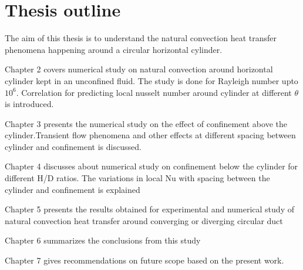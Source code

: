 \section{Thesis outline}
The aim of this thesis is to understand the natural convection heat transfer phenomena happening around a circular horizontal cylinder. 

 Chapter 2 covers numerical study on natural convection around horizontal cylinder kept in an unconfined fluid. The study is done for Rayleigh number upto $10^6$. Correlation for predicting local nusselt number around cylinder at different $\theta$ is introduced. 
 
 Chapter 3  presents the numerical study on the effect of confinement above the cylinder.Transient flow phenomena and other effects at different spacing between cylinder and confinement is discussed.
 
 Chapter 4 discusses about numerical study on confinement below the cylinder for different H/D ratios. The variations in local Nu with spacing between the cylinder and confinement is explained 
 
Chapter 5 presents the results obtained for experimental and numerical study of natural convection heat transfer around converging or diverging circular duct

Chapter 6 summarizes the conclusions from this study

Chapter 7 gives recommendations on future scope based on the present work.


